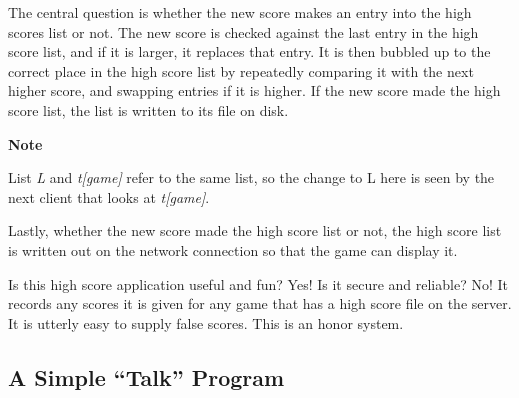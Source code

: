 The central question is whether the new score makes an entry into the
high scores list or not. The new score is checked against the last
entry in the high score list, and if it is larger, it replaces that
entry. It is then {\textquotedbl}bubbled{\textquotedbl} up to the
correct place in the high score list by repeatedly comparing it with
the next higher score, and swapping entries if it is higher. If the new
score made the high score list, the list is written to its file on
disk.


{\sffamily\bfseries
Note}

{\sffamily
List \textit{L} and \textit{t[game]} refer to the same list, so the
change to L here is seen by the next client that looks at
\textit{t[game]}.}

Lastly, whether the new score made the high score list or not, the high
score list is written out on the network connection so that the game
can display it.


Is this high score application useful and fun? Yes! Is it secure and
reliable? No! It records any scores it is given for any game that has a
high score file on the server. It is utterly easy to supply false
scores. This is an honor system.

\subsection{A Simple ``Talk'' Program}

